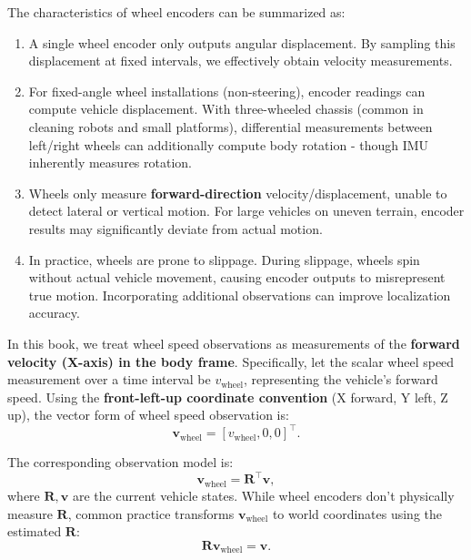 The characteristics of wheel encoders can be summarized as:
\begin{enumerate}
\item A single wheel encoder only outputs angular displacement. By sampling this displacement at fixed intervals, we effectively obtain velocity measurements.

\item For fixed-angle wheel installations (non-steering), encoder readings can compute vehicle displacement. With three-wheeled chassis (common in cleaning robots and small platforms), differential measurements between left/right wheels can additionally compute body rotation - though IMU inherently measures rotation.

\item Wheels only measure \textbf{forward-direction} velocity/displacement, unable to detect lateral or vertical motion. For large vehicles on uneven terrain, encoder results may significantly deviate from actual motion.

\item In practice, wheels are prone to slippage. During slippage, wheels spin without actual vehicle movement, causing encoder outputs to misrepresent true motion. Incorporating additional observations can improve localization accuracy.
\end{enumerate}
In this book, we treat wheel speed observations as measurements of the \textbf{forward velocity (X-axis) in the body frame}. Specifically, let the scalar wheel speed measurement over a time interval be $v_{\mathrm{wheel}}$, representing the vehicle's forward speed. Using the \textbf{front-left-up coordinate convention} (X forward, Y left, Z up), the vector form of wheel speed observation is:
\begin{equation}\label{eq:wheel-speed-vec}
\mathbf{v}_{\mathrm{wheel}} = [v_{\mathrm{wheel}}, 0, 0]^\top.
\end{equation}

The corresponding observation model is:
\begin{equation}\label{eq:wheel-obs-model}
\mathbf{v}_{\mathrm{wheel}} = \mathbf{R}^\top \mathbf{v},
\end{equation}
where $\mathbf{R}, \mathbf{v}$ are the current vehicle states. While wheel encoders don't physically measure $\mathbf{R}$, common practice transforms $\mathbf{v}_{\mathrm{wheel}}$ to world coordinates using the estimated $\mathbf{R}$:
\begin{equation}\label{eq:world-vel-obs}
\mathbf{R} \mathbf{v}_{\mathrm{wheel}} = \mathbf{v}.
\end{equation}

